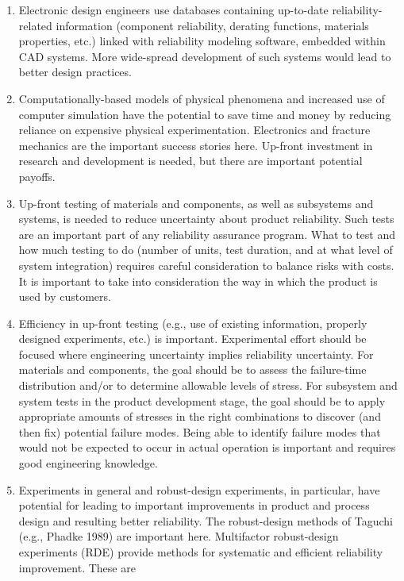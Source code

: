 \begin{enumerate}

\item
Electronic design engineers use databases containing up-to-date
reliability-related information (component reliability, derating
functions, materials properties, etc.) linked with reliability modeling
software, embedded within CAD systems. More wide-spread development of
such systems would lead to better design practices.

\item
Computationally-based models of physical phenomena and increased use
of computer simulation have the potential to save time and money by
reducing reliance on expensive physical experimentation. Electronics
and fracture mechanics are the important success stories
here. Up-front investment in research and development is needed, but
there are important potential payoffs.
\item
Up-front testing of materials and components, as well as subsystems
and systems, is needed to reduce uncertainty about product
reliability. Such tests are an important part of any reliability
assurance program. What to test and how much testing to do (number
of units, test duration, and at what level of system integration)
requires careful consideration to balance risks with costs. It is
important to take into consideration the way in which the product is
used by customers.
\item
Efficiency in up-front testing (e.g., use of existing information,
properly designed experiments, etc.) is important.  Experimental
effort should be focused where engineering uncertainty implies
reliability uncertainty. For materials and components, the goal
should be to assess the failure-time distribution and/or to
determine allowable levels of stress. For subsystem and system tests
in the product development stage, the goal should be to apply
appropriate amounts of stresses in the right combinations to
discover (and then fix) potential failure modes.  Being able to
identify failure modes that would not be expected to occur in actual
operation is important and requires good engineering knowledge.
\item
Experiments in general and robust-design experiments, in particular,
have potential for leading to important improvements in product and
process design and resulting better reliability. The robust-design
methods of Taguchi (e.g., Phadke 1989) are important
here. Multifactor robust-design experiments (RDE) provide methods
for systematic and efficient reliability improvement.  These are

\end{enumerate}
